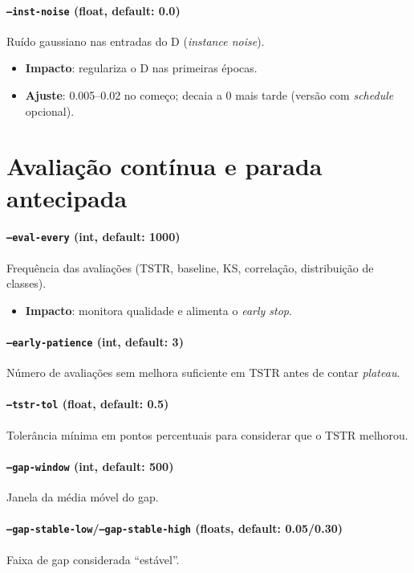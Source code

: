 \documentclass[11pt,a4paper]{article}
\begin{document}
\paragraph{\texttt{--inst-noise} (float, default: 0.0)} Ruído gaussiano nas entradas do D (\emph{instance noise}).
\begin{itemize}[leftmargin=1.2em]
  \item \textbf{Impacto}: regulariza o D nas primeiras épocas.
  \item \textbf{Ajuste}: 0.005--0.02 no começo; decaia a 0 mais tarde (versão com \emph{schedule} opcional).
\end{itemize}

\section{Avaliação contínua e parada antecipada}

\paragraph{\texttt{--eval-every} (int, default: 1000)} Frequência das avaliações (TSTR, baseline, KS, correlação, distribuição de classes).
\begin{itemize}[leftmargin=1.2em]
  \item \textbf{Impacto}: monitora qualidade e alimenta o \emph{early stop}.
\end{itemize}

\paragraph{\texttt{--early-patience} (int, default: 3)} Número de avaliações sem melhora suficiente em TSTR antes de contar \emph{plateau}.
\paragraph{\texttt{--tstr-tol} (float, default: 0.5)} Tolerância mínima em pontos percentuais para considerar que o TSTR melhorou.
\paragraph{\texttt{--gap-window} (int, default: 500)} Janela da média móvel do gap.
\paragraph{\texttt{--gap-stable-low}/\texttt{--gap-stable-high} (floats, default: 0.05/0.30)} Faixa de gap considerada ``estável''.
\end{document}
